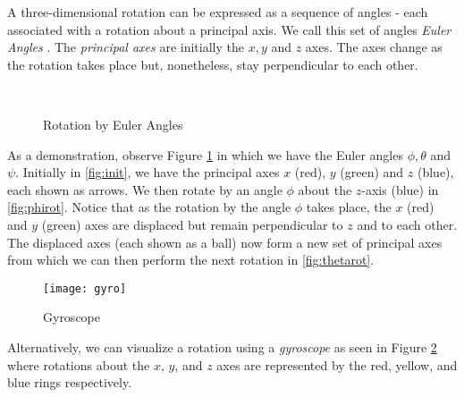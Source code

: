  A three-dimensional rotation can be expressed as a sequence of angles - each associated with a rotation about a principal axis. We call this set of angles \emph{Euler Angles} \cite{lerios} \cite{goldstein} \cite{strauch}. The \emph{principal axes} are initially the $x, y$ and $z$ axes. The axes change as the rotation takes place but, nonetheless, stay perpendicular to each other. 

\begin{figure}[H]
	\centering
	\qquad
	\\
	\qquad
	\caption{\cite{strauch} \cite{goldstein} Rotation by Euler Angles}
	\label{eulerang}
\end{figure}

 As a demonstration, observe Figure \ref{eulerang} in which we have the Euler angles $\phi, \theta$ and $\psi$. Initially in \ref{fig:init}, we have the principal axes $x$ (red), $y$ (green) and $z$ (blue), each shown as arrows. We then rotate by an angle $\phi$ about the $z$-axis (blue) in \ref{fig:phirot}. Notice that as the rotation by the angle $\phi$ takes place, the $x$ (red) and $y$ (green) axes are displaced but remain perpendicular to $z$ and to each other. The displaced axes (each shown as a ball) now form a new set of principal axes from which we can then perform the next rotation in \ref{fig:thetarot}. 

 \begin{figure}[H]
 	\centering
	\texttt{[image: gyro]}
 	\caption{\cite{hernandez} Gyroscope}
 	\label{gyroscope}
 \end{figure}

 Alternatively, we can visualize a rotation using a \emph{gyroscope} as seen in Figure \ref{gyroscope} where rotations about the $x$, $y$, and $z$ axes are represented by the red, yellow, and blue rings respectively.
 
